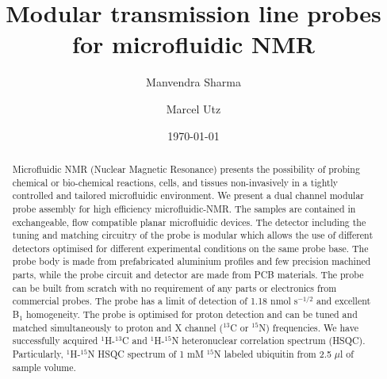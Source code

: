 \documentclass[preprint,12pt]{article}
\begin{document}
\title{Modular transmission line probes for microfluidic NMR}
\author[1]{Manvendra Sharma}
\author[1]{Marcel Utz}
\date{\today}
\setcounter{Maxaffil}{0}
\renewcommand\Affilfont{\itshape\footnotesize}
\maketitle
\clearpage
\begin{abstract}
Microfluidic NMR (Nuclear Magnetic Resonance) presents the possibility of probing chemical or bio-chemical reactions, cells, and tissues non-invasively in a tightly controlled and tailored microfluidic environment. We present a dual channel modular probe assembly for  high efficiency microfluidic-NMR. The samples are contained in exchangeable, flow compatible planar microfluidic devices. The detector including the tuning and matching circuitry of the probe is modular which allows the use of different detectors optimised for different experimental conditions on the same probe base. The probe body is made from prefabricated aluminium profiles and few precision machined parts, while the probe circuit and detector are made from PCB materials. The probe can be built from scratch with no requirement of any parts or electronics from commercial probes. The probe has a limit of detection of 1.18 nmol s$^{-1/2}$ and excellent B$_{1}$ homogeneity. The probe is optimised for proton detection and can be tuned and matched simultaneously to proton and X channel ($^{13}$C or $^{15}$N) frequencies. We have successfully acquired $^1$H-$^{13}$C and $^1$H-$^{15}$N heteronuclear correlation spectrum (HSQC). Particularly, $^1$H-$^{15}$N HSQC spectrum of 1 mM $^{15}$N labeled ubiquitin from 2.5 $\mu$l of sample volume.
\end{abstract}
\maketitle
\end{document}
